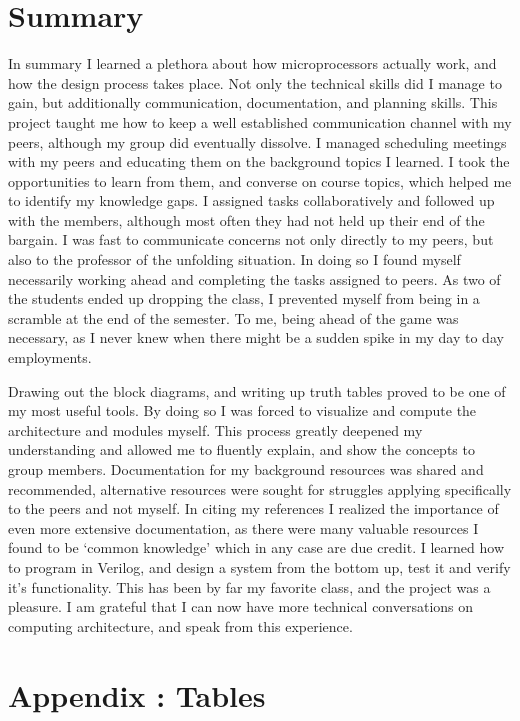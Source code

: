 \documentclass{article}
\begin{document}
\section{Summary}
In summary I learned a plethora about how microprocessors actually work, and how the design process takes place.
Not only the technical skills did I manage to gain, but additionally communication, documentation, and planning skills.
This project taught me how to keep a well established communication channel with my peers, although my group did eventually dissolve.
I managed scheduling meetings with my peers and educating them on the background topics I learned.
I took the opportunities to learn from them, and converse on course topics, which helped me to identify my knowledge gaps.
I assigned tasks collaboratively and followed up with the members, although most often they had not held up their end of the bargain.
I was fast to communicate concerns not only directly to my peers, but also to the professor of the unfolding situation.
In doing so I found myself necessarily working ahead and completing the tasks assigned to peers.
As two of the students ended up dropping the class, I prevented myself from being in a scramble at the end of the semester.
To me, being ahead of the game was necessary, as I never knew when there might be a sudden spike in my day to day employments.

Drawing out the block diagrams, and writing up truth tables proved to be one of my most useful tools.
By doing so I was forced to visualize and compute the architecture and modules myself.
This process greatly deepened my understanding and allowed me to fluently explain, and show the concepts to group members.
Documentation for my background resources was shared and recommended, alternative resources were sought for struggles applying specifically to the peers and not myself.
In citing my references I realized the importance of even more extensive documentation, as there were many valuable resources I found to be `common knowledge' which in any case are due credit.
I learned how to program in Verilog, and design a system from the bottom up, test it and verify it's functionality.
This has been by far my favorite class, and the project was a pleasure.
I am grateful that I can now have more technical conversations on computing architecture, and speak from this experience.

\newpage

\section{Appendix : Tables}
\end{document}
